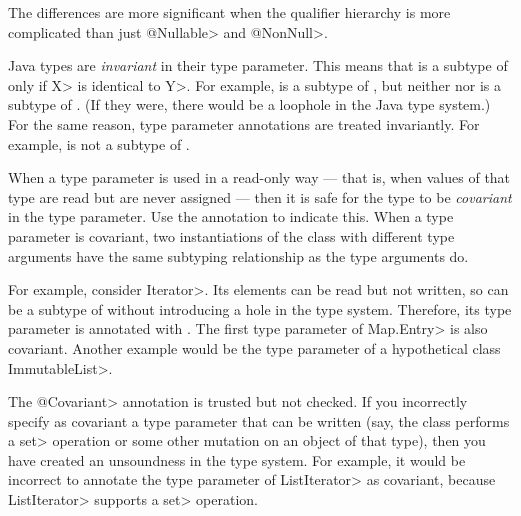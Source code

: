 The differences are more
significant when the qualifier hierarchy is more complicated than just
\<@Nullable> and \<@NonNull>.


Java types are \emph{invariant} in their type parameter.  This means that
 is a subtype of  only if \<X> is identical to \<Y>.  For
example,  is a subtype of , but
neither  nor  is a subtype of
.  (If they were, there would be a loophole in the Java
type system.)  For the same reason, type parameter annotations are treated
invariantly.  For example,  is not a subtype
of .

When a type parameter is used in a read-only way --- that is, when values
of that type are read but are never assigned --- then it is safe for the
type to be \emph{covariant} in the type parameter.  Use the
 annotation to indicate this.
When a type parameter is covariant, two instantiations of the class with
different type arguments have the same subtyping relationship as the type
arguments do.

For example, consider \<Iterator>.  Its elements can be read but not
written, so  can be a subtype of
 without introducing a hole in the type system.
Therefore, its type parameter is annotated with
.
The first type parameter of \<Map.Entry> is also covariant.
Another example would be the type parameter of a hypothetical class
\<ImmutableList>.

The \<@Covariant> annotation is trusted but not checked.
If you incorrectly specify as covariant a type parameter that can be
written (say, the class performs a
\<set> operation or some other mutation on an object of that type), then
you have created an unsoundness in the type system.
For example, it would be incorrect to annotate the type parameter of
\<ListIterator> as covariant, because \<ListIterator> supports a \<set>
operation.


